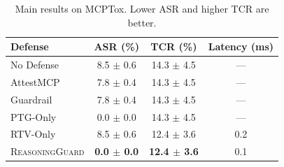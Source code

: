 \begin{table}[t]
\centering
\small
\begin{tabular}{lccc}
\toprule
Defense & ASR (\%) & TCR (\%) & Latency (ms) \\
\midrule
No Defense & 8.5 $\pm$ 0.6 & 14.3 $\pm$ 4.5 & --- \\
AttestMCP & 7.8 $\pm$ 0.4 & 14.3 $\pm$ 4.5 & --- \\
Guardrail & 7.8 $\pm$ 0.4 & 14.3 $\pm$ 4.5 & --- \\
PTG-Only & 0.0 $\pm$ 0.0 & 14.3 $\pm$ 4.5 & --- \\
RTV-Only & 8.5 $\pm$ 0.6 & 12.4 $\pm$ 3.6 & 0.2 \\
\textsc{ReasoningGuard} & \textbf{0.0 $\pm$ 0.0} & \textbf{12.4 $\pm$ 3.6} & 0.1 \\
\bottomrule
\end{tabular}
\caption{Main results on MCPTox. Lower ASR and higher TCR are better.}
\label{tab:main}
\end{table}
